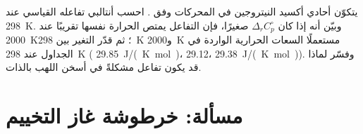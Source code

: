 \begin{exercise}[$\star\star\star$]\label{exo:b2:reaction-enthalpy:12}
يتكوّن أحادي أكسيد النيتروجين في المحركات وفق .
احسب أنتالبي تفاعله القياسي عند \qty{298}{K}. وبيّن أنه إذا كان
$\Delta_r C_p^\circ$ صغيرًا، فإن التفاعل يمتص الحرارة نفسها تقريبًا عند
\qty{2000}{K}؛ ثم قدّر التغير بين \qty{298}{K} و\qty{2000}{K} مستعملًا
السعات الحرارية الواردة في الجداول عند \qty{298}{K}
( \qty{29.85}{J/(K.mol)}،  29.12، 
\qty{29.38}{J/(K.mol)}). وفسّر لماذا قد يكون تفاعل  مشكلةً
في أسخن اللهب بالذات.
\end{exercise}

\section{مسألة: خرطوشة غاز التخييم}


